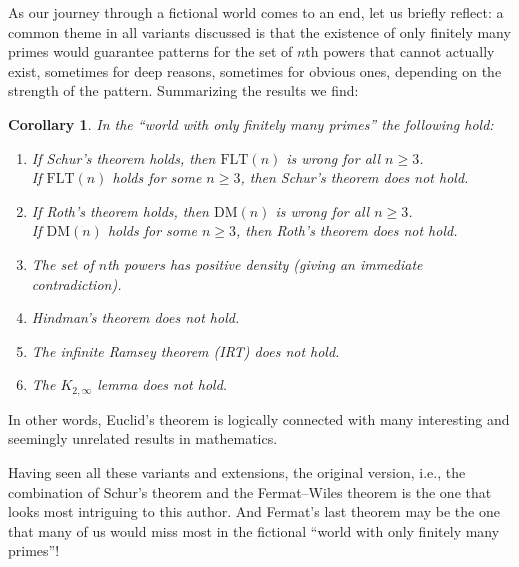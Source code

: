 \documentclass[12pt]{article}
\theoremstyle{theorem}
\newtheorem{corollary}{Corollary}
\theoremstyle{definition}
\newcommand{\FLT}{\mathrm{FLT}}
\newcommand{\DM}{\mathrm{DM}}
\begin{document}
As our journey through a fictional world comes to an end, 
let us briefly reflect:
a common theme in all variants discussed is that the existence of only 
finitely many
primes would guarantee patterns for the set of $n$th powers that cannot
actually exist, sometimes for deep reasons, 
sometimes for obvious ones, depending on
the strength of the pattern.
Summarizing the results we find:
\begin{corollary}
In the ``world with only finitely many primes'' the following hold:
\begin{enumerate}
\item
If Schur's theorem holds, then $\FLT(n)$ is wrong for all $n \geq 3$.\\
If $\FLT(n)$ holds for some $n \geq 3$, then Schur's theorem does not hold. 
\item If Roth's theorem holds, then $\DM(n)$ is wrong for all $n \geq 3$.\\
If $\DM(n)$ holds for some $n \geq 3$, then Roth's theorem does not hold. 
\item The set of $n$th powers has positive density
  (giving an immediate contradiction).
\item Hindman's theorem does not hold.
\item The infinite Ramsey theorem (IRT) does not hold.
\item The $K_{2, \infty}$ lemma does not hold.
\end{enumerate}
\end{corollary}
In other words, Euclid's theorem is logically connected
with many interesting and seemingly unrelated results in mathematics.

Having seen all these variants and extensions, the original version, 
i.e., the combination of Schur's
theorem and the Fermat--Wiles theorem is the one that
looks most intriguing to this author. And Fermat's last theorem
may be the one that many of us
would miss most in the fictional ``world with only finitely many primes''!
\end{document}
